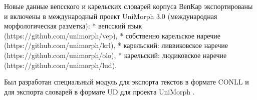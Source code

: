 Новые данные вепсского и карельских словарей корпуса ВепКар экспортированы и включены в международный проект UniMorph 3.0 (международная морфологическая разметка):
* вепсский язык (https://github.com/unimorph/vep),
* собственно карельское наречие (https://github.com/unimorph/krl),
* карельский: ливвиковское наречие (https://github.com/unimorph/olo),
* карельский: людиковское наречие (https://github.com/unimorph/lud).

Был разработан специальный модуль для экспорта текстов в формате CONLL и 
для экспорта словарей в формате UD для проекта UniMorph .











